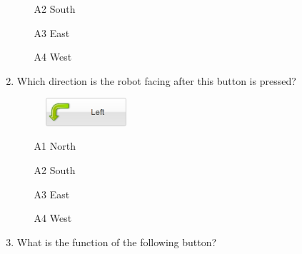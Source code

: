 \begin{enumerate}
\begin{enumerate}
\item[A2] South
\item[A3] East
\item[A4] West
\end{enumerate}
\item Which direction is the robot facing after 
this button is pressed?
\begin{figure}[!ht]
\begin{center}
\includegraphics[width=3cm]{img/button-left-3.png}
\end{center}
\end{figure}
\begin{enumerate}
\item[A1] North
\item[A2] South
\item[A3] East
\item[A4] West
\end{enumerate}
\item What is the function of the following button?
\newpage


\end{enumerate}
